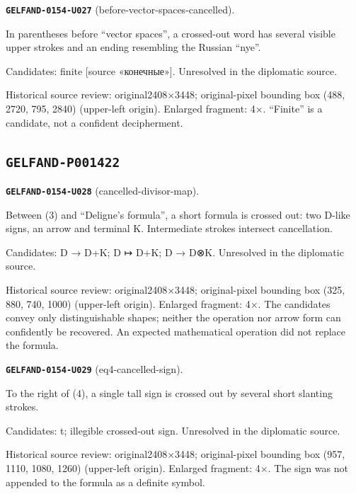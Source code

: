 \par\noindent\leavevmode{}\label{GELFAND-0154-U027}\textbf{\texttt{GELFAND-0154-U027}} (before-vector-spaces-cancelled).\nopagebreak[4]\par
In parentheses before “vector spaces”, a crossed-out word has several visible upper strokes and an ending resembling the Russian “nye”.\par
Candidates: finite [source «конечные»]. Unresolved in the diplomatic source.\par
Historical source review: original2408×3448; original-pixel bounding box (488, 2720, 795, 2840) (upper-left origin). Enlarged fragment: 4×. “Finite” is a candidate, not a confident decipherment.\par\medskip
\subsection*{\texttt{GELFAND-P001422}}
\par\noindent\leavevmode{}\label{GELFAND-0154-U028}\textbf{\texttt{GELFAND-0154-U028}} (cancelled-divisor-map).\nopagebreak[4]\par
Between (3) and “Deligne’s formula”, a short formula is crossed out: two D-like signs, an arrow and terminal K. Intermediate strokes intersect cancellation.\par
Candidates: D → D+K; D ↦ D+K; D → D⊗K. Unresolved in the diplomatic source.\par
Historical source review: original2408×3448; original-pixel bounding box (325, 880, 740, 1000) (upper-left origin). Enlarged fragment: 4×. The candidates convey only distinguishable shapes; neither the operation nor arrow form can confidently be recovered. An expected mathematical operation did not replace the formula.\par\medskip
\par\noindent\leavevmode{}\label{GELFAND-0154-U029}\textbf{\texttt{GELFAND-0154-U029}} (eq4-cancelled-sign).\nopagebreak[4]\par
To the right of (4), a single tall sign is crossed out by several short slanting strokes.\par
Candidates: t; illegible crossed-out sign. Unresolved in the diplomatic source.\par
Historical source review: original2408×3448; original-pixel bounding box (957, 1110, 1080, 1260) (upper-left origin). Enlarged fragment: 4×. The sign was not appended to the formula as a definite symbol.\par\medskip
